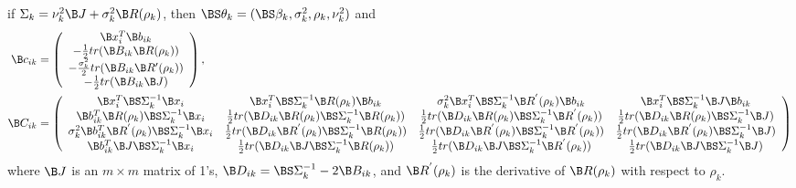 \begin{theorem}
if $\Sigma_{k}=\nu_{k}^{2}\B J+\sigma_{k}^{2}\B R(\rho_{k})$, then $\BS\theta_{k}=(\BS\beta_{k},\sigma^{2}_{k},\rho_{k},\nu_{k}^{2})$ and
\begin{align*}
\B c_{ik}&=\left( \begin{array}{c}\B x_{i}^{T}\B b_{ik}\\ -\frac{1}{2}tr( \B B_{ik} \B R(\rho_{k}))\\ -\frac{\sigma^{2}_{k}}{2}tr( \B B_{ik} \B R'(\rho_{k}))\\
-\frac{1}{2}tr( \B B_{ik} \B J)
\end{array}\right),\\
\B C_{ik}&=\left(\begin{array}{cccc} \B x_{i}^{T}\BS\Sigma_{k}^{-1}\B x_{i}& \B x_{i}^{T}\BS\Sigma_{k}^{-1}\B R(\rho_{k})\B b_{ik}&\sigma^{2}_{k}\B x_{i}^{T} \BS\Sigma^{-1}_{k}\B R^{'}(\rho_{k})\B b_{ik}&\B x_{i}^{T} \BS\Sigma^{-1}_{k}\B J \B b_{ik}\\  
\B b^{T}_{ik}\B R(\rho_{k})\BS\Sigma_{k}^{-1}\B x_{i}&\frac{1}{2}tr(\B D_{ik}\B R(\rho_{k})\BS\Sigma_{k}^{-1}\B R(\rho_{k}))&\frac{1}{2}tr(\B D_{ik}\B R(\rho_{k})\BS\Sigma_{k}^{-1}\B R^{'}(\rho_{k}))&\frac{1}{2}tr(\B D_{ik}\B R(\rho_{k})\BS\Sigma_{k}^{-1}\B J)\\ 
\sigma^{2}_{k}\B b_{ik}^{T}\B R^{'}(\rho_{k}) \BS\Sigma^{-1}_{k}\B x_{i}&\frac{1}{2}tr(\B D_{ik}\B R^{'}(\rho_{k})\BS\Sigma_{k}^{-1}\B R(\rho_{k}))&\frac{1}{2}tr(\B D_{ik}\B R^{'}(\rho_{k})\BS\Sigma_{k}^{-1}\B R^{'}(\rho_{k}))&\frac{1}{2}tr(\B D_{ik}\B R^{'}(\rho_{k})\BS\Sigma_{k}^{-1}\B J)\\
 \B b_{ik}^{T}\B J \BS\Sigma^{-1}_{k}\B x_{i}&\frac{1}{2}tr(\B D_{ik}\B J\BS\Sigma_{k}^{-1}\B R(\rho_{k}))&\frac{1}{2}tr(\B D_{ik}\B J\BS\Sigma_{k}^{-1}\B R^{'}(\rho_{k}))&\frac{1}{2}tr(\B D_{ik}\B J\BS\Sigma_{k}^{-1}\B J)\\
\end{array} \right)
\end{align*}
where $\B J$ is an $m\times m$ matrix of 1's, $\B D_{ik} = \BS\Sigma_{k}^{-1}-2\B B_{ik}$, and $\B R^{'}(\rho_{k})$ is the derivative  of $\B R(\rho_{k})$ with respect to $\rho_{k}$. 
\end{theorem}

